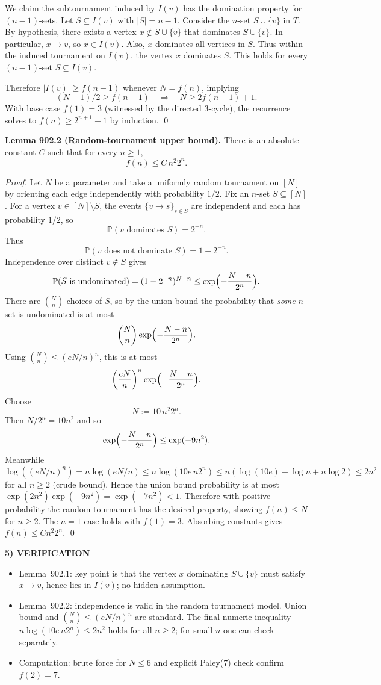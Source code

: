 We claim the subtournament induced by $I(v)$ has the domination property for
$(n-1)$-sets. Let $S\subseteq I(v)$ with $|S|=n-1$.
Consider the $n$-set $S\cup\{v\}$ in $T$.
By hypothesis, there exists a vertex $x\notin S\cup\{v\}$ that dominates
$S\cup\{v\}$.
In particular, $x\to v$, so $x\in I(v)$.
Also, $x$ dominates all vertices in $S$.
Thus within the induced tournament on $I(v)$, the vertex $x$ dominates $S$.
This holds for every $(n-1)$-set $S\subseteq I(v)$.

Therefore $|I(v)|\ge f(n-1)$ whenever $N=f(n)$, implying
\[(N-1)/2 \ge f(n-1)\quad\Rightarrow\quad N\ge 2f(n-1)+1.
\]
With base case $f(1)=3$ (witnessed by the directed 3-cycle), the recurrence solves
to $f(n)\ge 2^{n+1}-1$ by induction.
\qed

\medskip
\noindent\textbf{Lemma 902.2 (Random-tournament upper bound).}
There is an absolute constant $C$ such that for every $n\ge 1$,
\[ f(n)\le C\, n^2 2^n. \]

\emph{Proof.}
Let $N$ be a parameter and take a uniformly random tournament on $[N]$ by
orienting each edge independently with probability $1/2$.
Fix an $n$-set $S\subseteq[N]$.
For a vertex $v\in[N]\setminus S$, the events $\{v\to s\}_{s\in S}$ are independent
and each has probability $1/2$, so
\[\mathbb{P}(v\text{ dominates }S)=2^{-n}.
\]
Thus
\[\mathbb{P}(v\text{ does not dominate }S)=1-2^{-n}.
\]
Independence over distinct $v\notin S$ gives
\[
\mathbb{P}(S\text{ is undominated}) = (1-2^{-n})^{N-n}
\le \exp\Bigl(-\frac{N-n}{2^n}\Bigr).
\]
There are $\binom{N}{n}$ choices of $S$, so by the union bound the probability
that \emph{some} $n$-set is undominated is at most
\[
\binom{N}{n}\exp\Bigl(-\frac{N-n}{2^n}\Bigr).
\]
Using $\binom{N}{n}\le (eN/n)^n$, this is at most
\[
\left(\frac{eN}{n}\right)^n \exp\Bigl(-\frac{N-n}{2^n}\Bigr).
\]
Choose
\[ N := 10\,n^2 2^n. \]
Then $N/2^n=10n^2$ and so
\[
\exp\Bigl(-\frac{N-n}{2^n}\Bigr) \le \exp(-9n^2).
\]
Meanwhile
\[
\log\left( (eN/n)^n\right) = n\log(eN/n) \le n\log(10e\,n2^n)
\le n(\log(10e)+\log n + n\log 2)\le 2n^2
\]
for all $n\ge 2$ (crude bound).
Hence the union bound probability is at most $\exp(2n^2)\exp(-9n^2)=\exp(-7n^2)<1$.
Therefore with positive probability the random tournament has the desired
property, showing $f(n)\le N$ for $n\ge 2$.
The $n=1$ case holds with $f(1)=3$.
Absorbing constants gives $f(n)\le Cn^2 2^n$.
\qed

\medskip
\noindent\textbf{5) VERIFICATION}

\begin{itemize}
\item Lemma~902.1: key point is that the vertex $x$ dominating $S\cup\{v\}$ must
satisfy $x\to v$, hence lies in $I(v)$; no hidden assumption.
\item Lemma~902.2: independence is valid in the random tournament model.
Union bound and $\binom{N}{n}\le (eN/n)^n$ are standard.
The final numeric inequality $n\log(10e\,n2^n)\le 2n^2$ holds for all $n\ge 2$;
for small $n$ one can check separately.
\item Computation: brute force for $N\le 6$ and explicit Paley(7) check confirm
$f(2)=7$.
\end{itemize}

